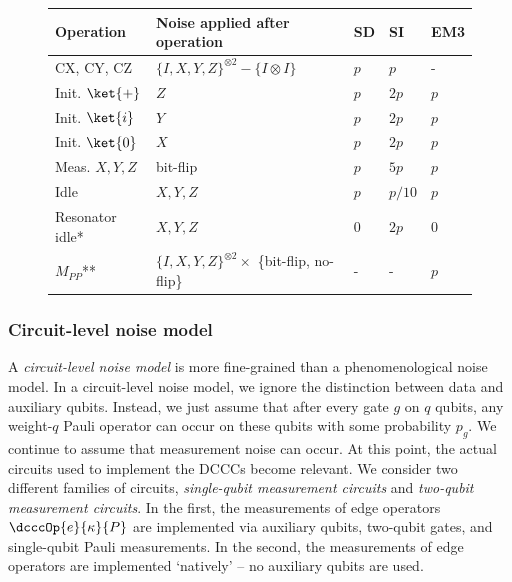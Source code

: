\begin{figure}[p]
    \begingroup
    \renewcommand*{\arraystretch}{1.2}
    \centering
    \begin{tabular}{|p{30mm}|p{60 mm}|p{10mm}|p{10mm}|p{10mm}|}
        \hline
        Operation & Noise applied after operation & SD & SI & EM3 \\
        \hline
        \hline
        CX, CY, CZ & $\{I,X,Y,Z\}^{\otimes 2} - \{I \otimes I\}$ & $p$ & $p$ & -  \\
        \hline
        Init. $\ket{+}$ & $Z$ & $p$ & $2p$ & $p$ \\
        Init. $\ket{i}$ & $Y$ & $p$ & $2p$ & $p$ \\
        Init. $\ket{0}$ & $X$ & $p$ & $2p$ & $p$ \\
        \hline
        Meas. $X, Y, Z$ & bit-flip &  $p$ & $5p$ & $p$ \\
        \hline
        Idle & $X,Y,Z$ & $p$ & $p/10$ & $p$ \\
        \hline
        Resonator idle* & $X,Y,Z$ & 0 & $2p$ &$0$ \\
        \hline
        $M_{PP}$** & $\{I, X, Y, Z\}^{\otimes 2} \times $ \{bit-flip, no-flip\} & - & - & $p$ \\

        \hline

    \end{tabular}
    \label{tab:noise_table}
    \endgroup
\end{figure}

\subsubsection{Circuit-level noise model}

A \textit{circuit-level noise model} is more fine-grained than a phenomenological noise model.
In a circuit-level noise model,
we ignore the distinction between data and auxiliary qubits.
Instead, we just assume that after every gate $g$ on $q$ qubits, any weight-$q$ Pauli operator can occur on these qubits with some probability $p_g$.
We continue to assume that measurement noise can occur.
At this point, the actual circuits used to implement the DCCCs become relevant.
We consider two different families of circuits, \emph{single-qubit measurement circuits} and \emph{two-qubit measurement circuits}.
In the first, the measurements of edge operators $\dcccOp{e}{\kappa}{P}$ are implemented via auxiliary qubits, two-qubit gates, and single-qubit Pauli measurements.
In the second, the measurements of edge operators are implemented `natively' -- no auxiliary qubits are used.

